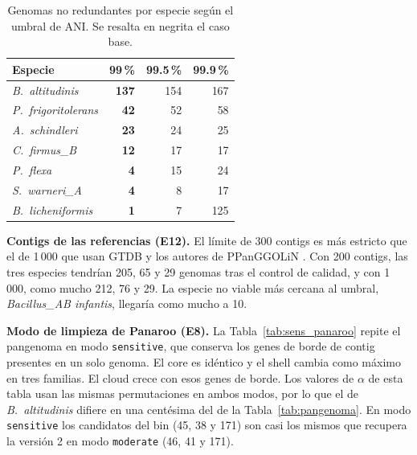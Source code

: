 \begin{table}[H]
\centering
\footnotesize
\caption[Sensibilidad al umbral de desreplicación]{Genomas no redundantes por
especie según el umbral de ANI. Se resalta en negrita el caso base.}
\label{tab:sens_drep}
\begin{tabular}{lrrr}
\toprule
\textbf{Especie} & \textbf{99\,\%} & \textbf{99.5\,\%} & \textbf{99.9\,\%} \\
\midrule
\textit{B.~altitudinis} & \textbf{137} & 154 & 167 \\
\textit{P.~frigoritolerans} & \textbf{42} & 52 & 58 \\
\textit{A.~schindleri} & \textbf{23} & 24 & 25 \\
\textit{C.~firmus\_B} & \textbf{12} & 17 & 17 \\
\textit{P.~flexa} & \textbf{4} & 15 & 24 \\
\textit{S.~warneri\_A} & \textbf{4} & 8 & 17 \\
\textit{B.~licheniformis} & \textbf{1} & 7 & 125 \\
\bottomrule
\end{tabular}
\end{table}

\textbf{Contigs de las referencias (E12).} El límite de 300 contigs es más
estricto que el de 1\,000 que usan GTDB y los autores de PPanGGOLiN
\cite{parks2022,ppanggolin2020}. Con 200 contigs, las tres especies tendrían
205, 65 y 29 genomas tras el control de calidad, y con 1\,000, como mucho 212,
76 y 29. La especie no viable más cercana al umbral, \textit{Bacillus\_AB
infantis}, llegaría como mucho a 10.

\textbf{Modo de limpieza de Panaroo (E8).} La Tabla~\ref{tab:sens_panaroo}
repite el pangenoma en modo \texttt{sensitive}, que conserva los genes de borde
de contig presentes en un solo genoma. El core es idéntico y el shell cambia
como máximo en tres familias. El cloud crece con esos genes de borde. Los
valores de $\alpha$ de esta tabla usan las mismas permutaciones en ambos modos,
por lo que el de \textit{B.~altitudinis} difiere en una centésima del de la
Tabla~\ref{tab:pangenoma}. En modo \texttt{sensitive} los candidatos del bin
(45, 38 y 171) son casi los mismos que recupera la versión 2 en modo
\texttt{moderate} (46, 41 y 171).

